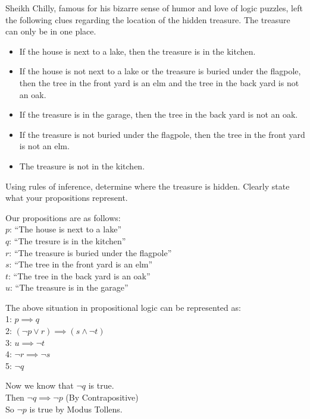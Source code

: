 \documentclass[addpoints]{exam}
\newenvironment{problem}[2][Problem]{\begin{trivlist}
    \item[\hskip \labelsep {\bfseries #1}\hskip \labelsep {\bfseries #2.}]}{\end{trivlist}}
\begin{document}
\begin{sloppypar}
\begin{problem}{6}
Sheikh Chilly, famous for his bizarre sense of humor and love of logic puzzles, left the following clues
regarding the location of the hidden treasure. The treasure can only be in one place.
\begin{itemize}
    \item If the house is next to a lake, then the treasure is in the kitchen.
    \item If the house is not next to a lake or the treasure is buried under the flagpole, then the tree in the front yard is an elm and the tree in the back yard is not an oak.
    \item If the treasure is in the garage, then the tree in the back yard is not an oak.
    \item If the treasure is not buried under the flagpole, then the tree in the front yard is not an elm.
    \item The treasure is not in the kitchen.
\end{itemize}
Using rules of inference, determine where the treasure is hidden. Clearly state what your propositions
represent.
\end{problem}

\begin{questions}
    \question
    \begin{solution}
        Our propositions are as follows: \\ 
        $p$: ``The house is next to a lake'' \\ 
        $q$: ``The tresure is in the kitchen'' \\ 
        $r$: ``The treasure is buried under the flagpole'' \\ 
        $s$: ``The tree in the front yard is an elm'' \\ 
        $t$: ``The tree in the back yard is an oak'' \\ 
        $u$: ``The treasure is in the garage'' 

        The above situation in propositional logic can be represented as: \\ 
        1: $ p \implies q $ \\ 
        2: $ (\neg p \lor r) \implies (s \land \neg t) $ \\ 
        3: $ u \implies \neg t $ \\ 
        4: $ \neg r \implies \neg s $ \\ 
        5: $ \neg q $
        
        \vspace{2mm}
        Now we know that $ \neg q $ is true. \\ 
        Then $ \neg q \implies \neg p $ (By Contrapositive) \\ 
        So $ \neg p $ is true by Modus Tollens.
        

\end{solution}
\end{questions}
\end{sloppypar}
\end{document}
